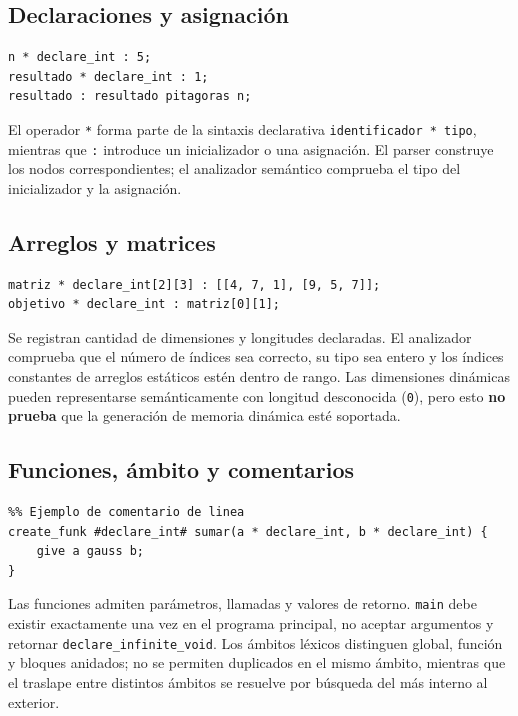 \subsection{Declaraciones y
asignación}\label{42-declaraciones-y-asignaciuxf3n}

\begin{lstlisting}
n * declare_int : 5;
resultado * declare_int : 1;
resultado : resultado pitagoras n;
\end{lstlisting}

El operador \texttt{*} forma parte de la sintaxis
declarativa \texttt{identificador * tipo}, mientras que
\texttt{:} introduce un inicializador o una asignación.
El parser construye los nodos correspondientes; el analizador semántico
comprueba el tipo del inicializador y la asignación.

\subsection{Arreglos y matrices}\label{43-arreglos-y-matrices}

\begin{lstlisting}
matriz * declare_int[2][3] : [[4, 7, 1], [9, 5, 7]];
objetivo * declare_int : matriz[0][1];
\end{lstlisting}

Se registran cantidad de dimensiones y longitudes declaradas. El
analizador comprueba que el número de índices sea correcto, su tipo sea
entero y los índices constantes de arreglos estáticos estén dentro de
rango. Las dimensiones dinámicas pueden representarse semánticamente con
longitud desconocida (\texttt{0}), pero esto \textbf{no
prueba} que la generación de memoria dinámica esté soportada.

\subsection{Funciones, ámbito y
comentarios}\label{44-funciones-uxe1mbito-y-comentarios}

\begin{lstlisting}
%% Ejemplo de comentario de linea
create_funk #declare_int# sumar(a * declare_int, b * declare_int) {
    give a gauss b;
}
\end{lstlisting}

Las funciones admiten parámetros, llamadas y valores de retorno.
\texttt{main} debe existir exactamente una vez en el
programa principal, no aceptar argumentos y retornar
\texttt{declare\_infinite\_void}. Los ámbitos léxicos
distinguen global, función y bloques anidados; no se permiten duplicados
en el mismo ámbito, mientras que el traslape entre distintos ámbitos se
resuelve por búsqueda del más interno al exterior.
\newpage
